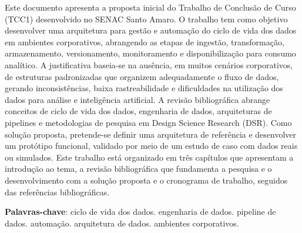 \documentclass[
    12pt,                %
    openright,           %
    oneside,             %
    a4paper,             %
    english,             %
    brazil               %
]{abntex2}
\begin{document}
\frenchspacing

\pretextual
\imprimircapa
\imprimirfolhaderosto

\begin{resumo}
Este documento apresenta a proposta inicial do Trabalho de Conclusão de Curso (TCC1) desenvolvido no SENAC Santo Amaro. O trabalho tem como objetivo desenvolver uma arquitetura para gestão e automação do ciclo de vida dos dados em ambientes corporativos, abrangendo as etapas de ingestão, transformação, armazenamento, versionamento, monitoramento e disponibilização para consumo analítico. A justificativa baseia-se na ausência, em muitos cenários corporativos, de estruturas padronizadas que organizem adequadamente o fluxo de dados, gerando inconsistências, baixa rastreabilidade e dificuldades na utilização dos dados para análise e inteligência artificial. A revisão bibliográfica abrange conceitos de ciclo de vida dos dados, engenharia de dados, arquiteturas de pipelines e metodologias de pesquisa em Design Science Research (DSR). Como solução proposta, pretende-se definir uma arquitetura de referência e desenvolver um protótipo funcional, validado por meio de um estudo de caso com dados reais ou simulados. Este trabalho está organizado em três capítulos que apresentam a introdução ao tema, a revisão bibliográfica que fundamenta a pesquisa e o desenvolvimento com a solução proposta e o cronograma de trabalho, seguidos das referências bibliográficas.

\vspace{\onelineskip}

\noindent
\textbf{Palavras-chave}: ciclo de vida dos dados. engenharia de dados. pipeline de dados. automação. arquitetura de dados. ambientes corporativos.
\end{resumo}

\tableofcontents*
\cleardoublepage

\textual
\end{document}
